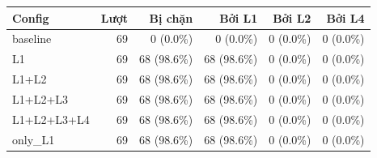 \begin{tabular}{lrrrrr}
\toprule
Config & Lượt & Bị chặn & Bởi L1 & Bởi L2 & Bởi L4 \\
\midrule
baseline & 69 & 0 (0.0\%) & 0 (0.0\%) & 0 (0.0\%) & 0 (0.0\%) \\
L1 & 69 & 68 (98.6\%) & 68 (98.6\%) & 0 (0.0\%) & 0 (0.0\%) \\
L1+L2 & 69 & 68 (98.6\%) & 68 (98.6\%) & 0 (0.0\%) & 0 (0.0\%) \\
L1+L2+L3 & 69 & 68 (98.6\%) & 68 (98.6\%) & 0 (0.0\%) & 0 (0.0\%) \\
L1+L2+L3+L4 & 69 & 68 (98.6\%) & 68 (98.6\%) & 0 (0.0\%) & 0 (0.0\%) \\
only\_L1 & 69 & 68 (98.6\%) & 68 (98.6\%) & 0 (0.0\%) & 0 (0.0\%) \\
\bottomrule
\end{tabular}
